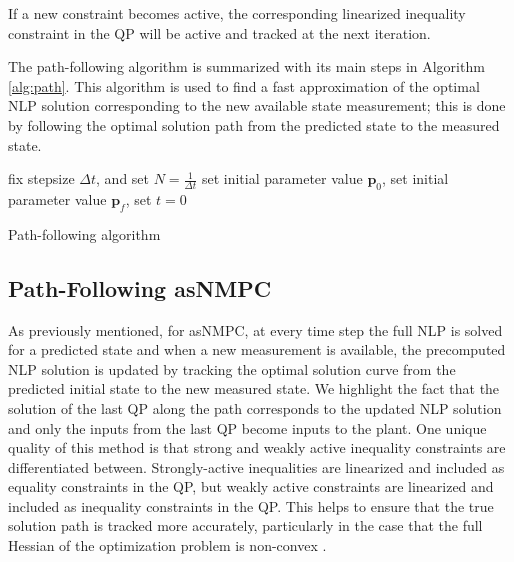 If a new constraint becomes active, the corresponding linearized inequality constraint in the QP will be active and tracked at the next iteration.
\par
The path-following algorithm is summarized with its main steps in Algorithm \ref{alg:path}.
This algorithm is used to find a fast approximation of the optimal NLP solution corresponding to the new available state measurement; this is done by following the optimal solution path from the predicted state to the measured state.\\
\begin{algorithm}[H]
\SetAlgoLined
{}
 fix stepsize $\Delta t$, and set $N=\frac{1}{\Delta t}$\;
 set initial parameter value $\boldsymbol{p}_0$,\;
 set initial parameter value $\boldsymbol{p}_f$,\;
 set $t=0$\;
 \caption{Path-following algorithm}
\end{algorithm}
\subsection{Path-Following asNMPC}
As previously mentioned, for asNMPC, at every time step the full NLP is solved for a predicted state and when a new measurement is available, the precomputed NLP solution is updated by tracking the optimal solution curve from the predicted initial state to the new measured state.
We highlight the fact that the solution of the last QP along the path corresponds to the updated NLP solution and only the inputs from the last QP become inputs to the plant.
One unique quality of this method is that strong and weakly active inequality constraints are differentiated between.
Strongly-active inequalities are linearized and included as equality constraints in the QP, but weakly active constraints are linearized and included as inequality constraints in the QP.
This helps to ensure that the true solution path is tracked more accurately, particularly in the case that the full Hessian of the optimization problem is non-convex \cite{economic}.

